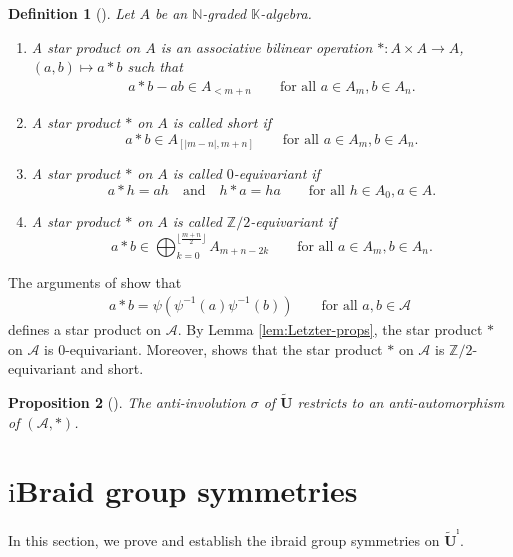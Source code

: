 \documentclass[a4paper,reqno,12pt]{amsart}
\numberwithin{equation}{section}
\newtheorem{proposition}{Proposition}[section]
\newtheorem{definition}[proposition]{Definition}
\theoremstyle{definition}
\theoremstyle{plain}
\theoremstyle{definition}
\def\K{\mathbb K}
\def\N{\mathbb N}
\def\Z{\mathbb Z}
\def\tU{\widetilde{\mathbf U}}
\def\tUi{\widetilde{\mathbf U}^{\imath}}
\def\cA{\mathcal A}
\newcommand{\redtext}[1]{\textcolor{red}{#1}}
\newcommand{\red}[1]{\redtext{ #1}}
\begin{document}
\begin{definition}
[{\cite[Subsection 2.1]{ES20}}]\label{def:star-prod}
Let $A$ be an $\N$-graded $\K$-algebra.
\begin{enumerate}
\item[(i)] A star product on $A$ is an associative bilinear operation $* : A \times A \to A$, $(a,b)\mapsto a\ast b$
such that
\begin{align}\label{eq:a*b-ab}
  a * b - ab \in A_{< m+ n} \qquad \mbox{for all $a \in A_m, b \in A_n$.}
\end{align}
\item[(ii)] A star product $*$ on $A$ is called short if 
\[
a * b \in A_{[|m-n|, m+n]} \qquad \mbox{for all $a \in A_m, b\in A_n$.} 
\]
\item[(iii)] A star product $\ast$ on $A$ is called $0$-equivariant
if
\[
a * h = ah \quad \mbox{and} \quad  h * a= h a \qquad \mbox{for all $h \in A_0, a \in A$.} 
\]
\item[(iv)] A star product $\ast$ on $A$ is called $\Z/2$-equivariant if 
\begin{equation}
\label{Z2cond}
a * b \in \bigoplus_{k=0}^{\lfloor \frac{m+n}{2} \rfloor} A_{m+n-2 k} \qquad \mbox{for all $a \in A_m, b \in A_n$.} 
\end{equation}
\end{enumerate} 
\end{definition}

The arguments of \cite[\S\S~3.1--3.2]{KY26} show that
\begin{align}\label{eq:ast-def}
  a\ast b = \psi(\psi^{-1}(a)\psi^{-1}(b)) \qquad \text{for all $a,b\in \cA$}
\end{align}
defines a star product on $\cA$. By Lemma \ref{lem:Letzter-props}, the star product $\ast$ on $\cA$ is $0$-equivariant. Moreover, \cite[Lemma 3.7, Theorem 3.10]{KY26} shows that the star product $\ast$ on $\cA$ is $\Z/2$-equivariant and short. 



\begin{proposition}[{\cite[Theorem 4.6]{KY26}}]\label{sigma of (A,*)}
The anti-involution $\sigma$ of $\tU$ restricts to an  anti-automorphism of $(\cA,\ast)$.    
\end{proposition}
\section{\texorpdfstring{$\mathrm i$}{i}Braid group symmetries}\label{sec:i braid action}
In this section, we prove \cite[Conjecture 5.13]{WZ23} and establish the ibraid group symmetries on $\tUi$.
\end{document}
